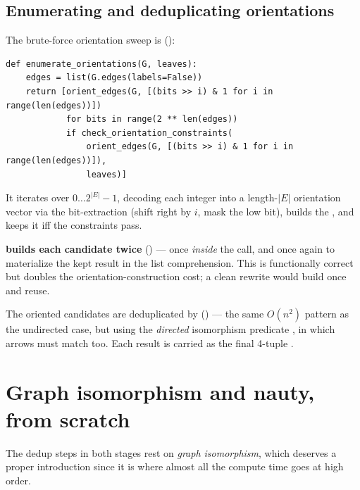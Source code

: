 \subsection{Enumerating and deduplicating orientations}

The brute-force orientation sweep is 
():

\begin{lstlisting}
def enumerate_orientations(G, leaves):
    edges = list(G.edges(labels=False))
    return [orient_edges(G, [(bits >> i) & 1 for i in range(len(edges))])
            for bits in range(2 ** len(edges))
            if check_orientation_constraints(
                orient_edges(G, [(bits >> i) & 1 for i in range(len(edges))]),
                leaves)]
\end{lstlisting}

It iterates  over $0 \ldots 2^{|E|}-1$, decoding each integer into a
length-$|E|$ orientation vector via the bit-extraction 
(shift right by $i$, mask the low bit), builds the , and keeps it
iff the constraints pass.

\begin{gotcha}
\label{gotcha:double-build}
\textbf{ builds each candidate 
twice} () --- once \emph{inside} the
 call, and once again to materialize
the kept result in the list comprehension. This is functionally correct but
doubles the orientation-construction cost; a clean rewrite would build once and
reuse.
\end{gotcha}

The oriented candidates are deduplicated by 
() --- the same $O(n^2)$ pattern as the
undirected case, but using the \emph{directed} isomorphism predicate
, in which arrows must match too.
Each result is carried as the final 4-tuple .

\section{Graph isomorphism and nauty, from scratch}
\label{sec:iso}

The dedup steps in both stages rest on \emph{graph isomorphism}, which deserves a
proper introduction since it is where almost all the compute time goes at high
order.

